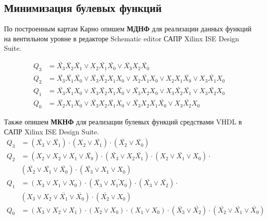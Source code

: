 \documentclass[a4paper,14pt]{extarticle}
\begin{document}
\subsection{Минимизация булевых функций}
По построенным картам Карно опишем \textbf{МДНФ} для реализации данных функций на вентильном уровне в редакторе Schematic editor САПР Xilinx ISE Design Suite.

\begin{align*}
	Q_3 &= \bar{X_3}\bar{X_2}\bar{X_1} \vee  X_2 \bar{X_1}\bar{X_0}  \vee \bar{X_3} X_2\bar{X_0} \\
	Q_2 &= \bar{X_3} \bar{X_1} \bar{X_0} \vee \bar{X_3} \bar{X_2} X_1 X_0 \vee X_2  \bar{X_1}  X_0 \vee X_2  X_1  \bar{X_0} \vee  X_3  \bar{X_1}  X_0 \\
	Q_1 &=  \bar{X_3}\bar{X_1}X_0    \vee  \bar{X_3} \bar{X_2} X_1 \bar{X_0} \vee     \bar{X_3} X_2  X_0  \vee  X_3 \bar{X_2} \bar{X_1}   \vee  X_3 \bar{X_2} X_0 \\
	Q_0 &= \bar{X_2} X_1 X_0 \vee \bar{X_3} X_2 \bar{X_1} X_0 \vee \bar{X_3} X_2 X_1 \bar{X_0} \vee X_3 \bar{X_2} X_0
 \end{align*}

Также опишем \textbf{МКНФ} для реализации булевых функций средствами VHDL в САПР Xilinx ISE Design Suite.
\begin{align*}
	Q_3 &=\left(
	\bar{X_3}\vee \bar{X_1}
	\right) 
	\cdot 
	\left(
	 X_2\vee \bar{X_1}
	 \right) 
	  \cdot  
	  \left(
	  \bar{X_2}\vee \bar{X_0}
	   \right) \\
	Q_2 &= \left(
	X_2 \vee X_2 \vee X_1 \vee \bar{X_0}
	\right) 
	\cdot 
	\left( 
	\bar{X_3} \vee X_2 \bar{X_1}
	 \right) 
	 \cdot 
	 \left(
	  X_2 \vee  \bar{X_1} \vee X_0
	   \right)
	    \cdot \\
	    & \left(
	    \bar{X_2}  \vee \bar{X_1} \vee \bar{X_0}
	    \right)
	     \cdot 
	      \left(\bar{X_3} \vee X_1 \vee X_0
	      \right)\\
	  Q_1 & = \left( X_3 \vee X_1 \vee X_0 \right) \cdot
	  \left( \bar{X_3} \vee \bar{X_1 X_0} \right) \cdot
	  \left( \bar{X_3} \vee \bar{X_2} \right) \cdot \\
	  & \left(X_3 \vee X_2 \vee \bar{X_1} \vee \bar{X_0}\right) \cdot
	  \left(\bar{X_2} \vee X_0\right)\\
	  Q_0 & = \left( X_3 \vee X_2 \vee X_1 \right) \cdot
	  \left(  X_2 \vee X_0 \right) \cdot
	  \left( X_1 \vee X_0  \right) \cdot
	  \left( \bar{X_3} \vee \bar{X_2} \right) \cdot
	  \left( \bar{X_2} \vee \bar{X_1} \vee \bar{X_0} \right)
\end{align*}
\end{document}
